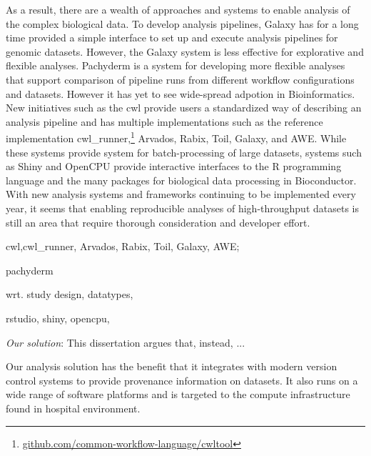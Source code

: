 As a result, there are a wealth of approaches and systems to enable analysis of
the complex biological data. To develop analysis pipelines, Galaxy\cite{galaxy}
has for a long time provided a simple interface to set up and execute analysis
pipelines for genomic datasets. However, the Galaxy system is less effective for
explorative and flexible analyses.\cite{spjuth2015experiences}
Pachyderm\cite{pachyderm} is a system for developing more flexible analyses that
support comparison of pipeline runs from different workflow configurations and
datasets. However it has yet to see wide-spread adpotion in Bioinformatics.
New initiatives such as the \gls{cwl} provide users a standardized way of
describing an analysis pipeline and has multiple implementations such as
the reference implementation
cwl\_runner,\footnote{\url{github.com/common-workflow-language/cwltool}}
Arvados,\cite{arvados} Rabix,\cite{rabix} Toil,\cite{toil} Galaxy,\cite{galaxy}
and AWE.\cite{awe} While these systems provide system for batch-processing of
large datasets, systems such as Shiny and OpenCPU provide interactive
interfaces to the R programming language and the many packages for biological
data processing in Bioconductor. 
With new analysis systems and frameworks continuing to be implemented every
year, it seems that enabling reproducible analyses of high-throughput datasets
is still an area that require thorough consideration and developer effort.

\begin{enumerate*}[label=(\roman*)]
    \item cwl,cwl\_runner, Arvados, Rabix, Toil, Galaxy,
        AWE;   
    \item pachyderm
    \item wrt. study design, datatypes, 
    \item rstudio, shiny, opencpu,
\end{enumerate*} 


\emph{Our solution}: 
This dissertation argues that, instead, ... 

Our analysis solution has the benefit that it integrates with modern version
control systems to provide provenance information on datasets. It also runs on a
wide range of software platforms and is targeted to the compute infrastructure
found in hospital environment. 

